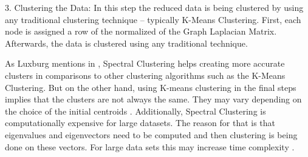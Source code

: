 3.	Clustering the Data: In this step the reduced data is being clustered by using any traditional clustering technique – typically K-Means Clustering. First, each node is assigned a row of the normalized of the Graph Laplacian Matrix. Afterwards, the data is clustered using any traditional technique. \newline

As Luxburg mentions in \cite{von2007tutorial}, Spectral Clustering helps creating more accurate clusters in comparisons to other clustering algorithms such as the K-Means Clustering. But on the other hand, using K-means clustering in the final steps implies that the clusters are not always the same. They may vary depending on the choice of the initial centroids \cite{spectral-website}. Additionally, Spectral Clustering is computationally expensive for large datasets. The reason for that is that eigenvalues and eigenvectors need to be computed and then clustering is being done on these vectors. For large data sets this may increase time complexity \cite{spectral-website}. \newline